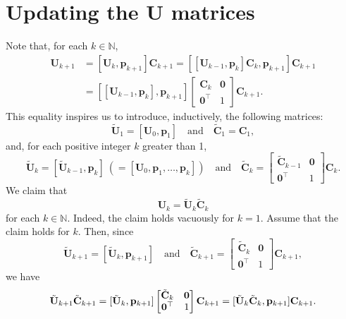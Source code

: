 \documentclass[11pt,a4paper]{article}
\newcommand{\0}{\M{0}}
\newcommand{\M}[1]{\mathbf{#1}}
\newcommand{\Mt}[1]{\tilde{\M{#1}}}
\newcommand{\N}{\mathbb{N}}
\newcommand{\T}{\top}
\newcommand{\ve}[1]{\mathbf{#1}}
\begin{document}
\section{Updating the $\M{U}$ matrices}

Note that, for each $k \in \N$, 
\begin{align*}
  \M{U}_{k+1}
  &
    = [\M{U}_k, \ve{p}_{k+1}] \M{C}_{k+1}
    =  [[\M{U}_{k-1}, \ve{p}_k] \M{C}_k, \ve{p}_{k+1}] \M{C}_{k+1}
  \\
  &
    =
    \left[
    [\M{U}_{k-1}, \ve{p}_k], \ve{p}_{k+1}
    \right]
    \begin{bmatrix}
      \M{C}_k & \0
      \\
      \0^\T & 1
    \end{bmatrix}
              \M{C}_{k+1}.
\end{align*}
This equality inspires us to introduce, inductively, the following matrices:
\begin{displaymath}
  \Mt{U}_1 = [\M{U}_0, \ve{p}_1]
  \quad
  \text{and}
  \quad
  \Mt{C}_1 = \M{C}_1,
\end{displaymath}
and, for each positive integer $k$ greater than 1, 
\begin{displaymath}
  \Mt{U}_k
  =
  [ \Mt{U}_{k-1},  \ve{p}_k]
  \
  (
  = 
  [\M{U}_0, \ve{p}_1, \dots, \ve{p}_k]
  )
  \quad
  \text{and}
  \quad
  \Mt{C}_k
  =
  \begin{bmatrix}
    \Mt{C}_{k-1} & \0
    \\
    \0^\T & 1
  \end{bmatrix}
  \M{C}_k.
\end{displaymath}
We claim that
\begin{equation}
  \label{eq:1}
  \M{U}_k = \Mt{U}_k \Mt{C}_k
\end{equation}
for each $k \in \N$.  Indeed, the claim holds vacuously for $k = 1$. Assume that the claim holds for $k$. Then, since
\begin{displaymath}
  \Mt{U}_{k+1} = [\Mt{U}_k, \ve{p}_{k+1}]
  \quad
  \text{and}
  \quad
  \Mt{C}_{k+1}
  =
  \begin{bmatrix}
    \Mt{C}_k & \0
    \\
    \0^\T & 1
  \end{bmatrix}
  \M{C}_{k+1},
\end{displaymath}
we have
\begin{displaymath}
  \Mt{U}_{k+1} \Mt{C}_{k+1}
  =
  [\Mt{U}_k, \ve{p}_{k+1}]
  \begin{bmatrix}
    \Mt{C}_k & \0
    \\
    \0^\T & 1
  \end{bmatrix}
  \M{C}_{k+1}
  \\
  =
  [\Mt{U}_k  \Mt{C}_k, \ve{p}_{k+1}] \M{C}_{k+1}.
\end{displaymath}
\end{document}
